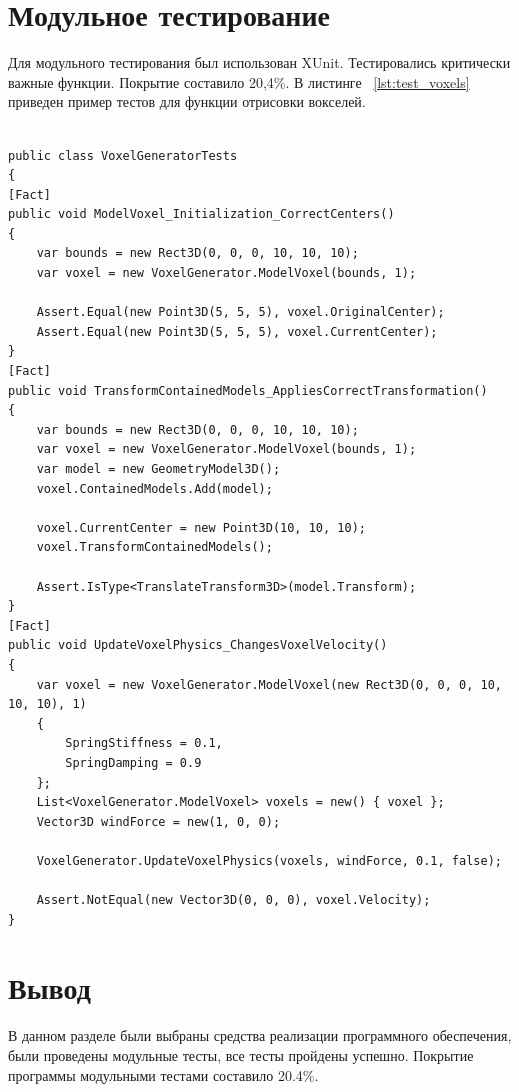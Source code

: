 \section{Модульное тестирование}

Для модульного тестирования был использован XUnit. Тестировались критически важные функции. Покрытие составило 20,4\%. В листинге ~\ref{lst:test_voxels} приведен пример тестов для функции отрисовки вокселей.
\newpage
\begin{lstlisting}[caption={Тест для функций отрисовки вокселей},label={lst:test_voxels}]

public class VoxelGeneratorTests
{
[Fact]
public void ModelVoxel_Initialization_CorrectCenters()
{
	var bounds = new Rect3D(0, 0, 0, 10, 10, 10);
	var voxel = new VoxelGenerator.ModelVoxel(bounds, 1);
	
	Assert.Equal(new Point3D(5, 5, 5), voxel.OriginalCenter);
	Assert.Equal(new Point3D(5, 5, 5), voxel.CurrentCenter);
}
[Fact]
public void TransformContainedModels_AppliesCorrectTransformation()
{
	var bounds = new Rect3D(0, 0, 0, 10, 10, 10);
	var voxel = new VoxelGenerator.ModelVoxel(bounds, 1);
	var model = new GeometryModel3D();
	voxel.ContainedModels.Add(model);
	
	voxel.CurrentCenter = new Point3D(10, 10, 10);
	voxel.TransformContainedModels();
	
	Assert.IsType<TranslateTransform3D>(model.Transform);
}
[Fact]
public void UpdateVoxelPhysics_ChangesVoxelVelocity()
{
	var voxel = new VoxelGenerator.ModelVoxel(new Rect3D(0, 0, 0, 10, 10, 10), 1)
	{
		SpringStiffness = 0.1,
		SpringDamping = 0.9
	};
	List<VoxelGenerator.ModelVoxel> voxels = new() { voxel };
	Vector3D windForce = new(1, 0, 0);
	
	VoxelGenerator.UpdateVoxelPhysics(voxels, windForce, 0.1, false);
	
	Assert.NotEqual(new Vector3D(0, 0, 0), voxel.Velocity);
}

\end{lstlisting}

\section*{Вывод}
В данном разделе были выбраны средства реализации программного обеспечения, были проведены модульные тесты, все тесты пройдены успешно. Покрытие программы модульными тестами составило 20.4\%.
